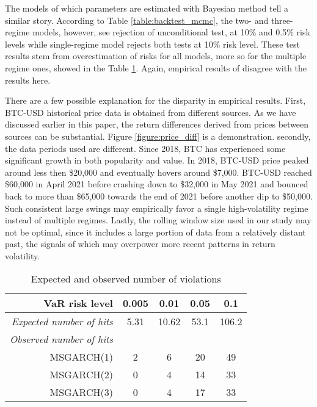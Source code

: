 \documentclass[12pt,a4paper]{article}
\begin{document}
The models of which parameters are estimated with Bayesian method tell a similar story. According to Table \ref{table:backtest_mcmc}, the two- and three-regime models, however, see rejection of unconditional test, at 10$\%$ and 0.5$\%$ risk levels while single-regime model rejects both tests at 10$\%$ risk level. These test results stem from overestimation of risks for all models, more so for the multiple regime ones, showed in the Table \ref{table:hitrate}. Again, empirical results of \cite{ardia2019regime} disagree with the results here.

There are a few possible explanation for the disparity in empirical results. First, BTC-USD historical price data is obtained from different sources. As we have discussed earlier in this paper, the return differences derived from prices between sources can be substantial. Figure \ref{figure:price_diff} is a demonstration. secondly, the data periods used are different. Since 2018, BTC has experienced some significant growth in both popularity and value. In 2018, BTC-USD price peaked around less then \$20,000 and eventually hovers around \$7,000. BTC-USD reached \$60,000 in April 2021 before crashing down to \$32,000 in May 2021 and bounced back to more than \$65,000 towards the end of 2021 before another dip to \$50,000. Such consistent large swings may empirically favor a single high-volatility regime instead of multiple regimes. Lastly, the rolling window size used in our study may not be optimal, since  it includes a large portion of data from a relatively distant past, the signals of which may overpower more recent patterns in return volatility.

\begin{table}[htp]
\centering
\caption{Expected and observed number of violations}
\label{table:hitrate}
\begin{tabular}{@{}rlclclclcl@{}}
\toprule
\multicolumn{2}{r}{VaR risk level}     & \multicolumn{2}{c}{0.005} & \multicolumn{2}{c}{0.01}  & \multicolumn{2}{c}{0.05} & \multicolumn{2}{c}{0.1}   \\ \midrule
\multicolumn{2}{r}{\textit{Expected number of hits}} & \multicolumn{2}{c}{5.31}  & \multicolumn{2}{c}{10.62} & \multicolumn{2}{c}{53.1} & \multicolumn{2}{c}{106.2} \\
\multicolumn{2}{r}{\textit{Observed number of hits}} & \multicolumn{8}{c}{}                                                                                         \\
\multicolumn{2}{r}{MSGARCH(1)}         & \multicolumn{2}{c}{2}     & \multicolumn{2}{c}{6}     & \multicolumn{2}{c}{20}   & \multicolumn{2}{c}{49}    \\
\multicolumn{2}{r}{MSGARCH(2)}         & \multicolumn{2}{c}{0}     & \multicolumn{2}{c}{4}     & \multicolumn{2}{c}{14}   & \multicolumn{2}{c}{33}    \\
\multicolumn{2}{r}{MSGARCH(3)}         & \multicolumn{2}{c}{0}     & \multicolumn{2}{c}{4}     & \multicolumn{2}{c}{17}   & \multicolumn{2}{c}{33}    \\ \bottomrule
\end{tabular}
\end{table}
\end{document}
